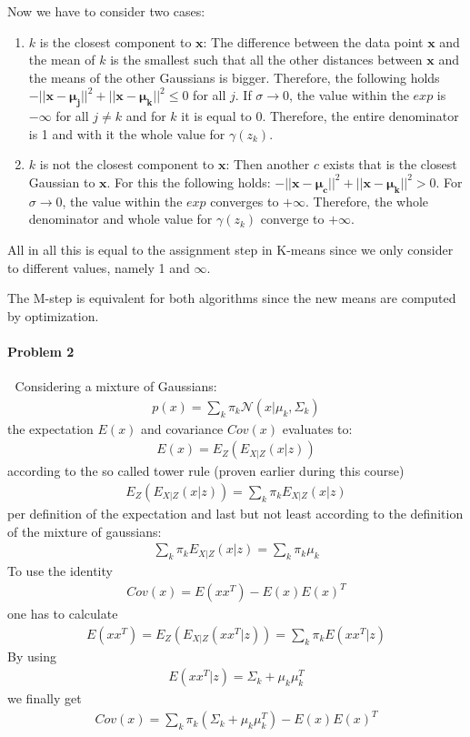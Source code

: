 \documentclass{article}
\renewcommand{\Vec}[1]{\ensuremath{\mathbf{#1}}}
\begin{document}
Now we have to consider two cases:
\begin{enumerate}
\item $k$ is the closest component to $\Vec{x}$: The difference between the data point $\Vec{x}$ and the mean of $k$ is the smallest such that all the other distances between $\Vec{x}$ and the means of the other Gaussians is bigger. Therefore, the following holds $-||\Vec{x}-\Vec{\mu_j}||^2 + ||\Vec{x}-\Vec{\mu_k}||^2 \leq 0$ for all $j$. If $\sigma \rightarrow 0$, the value within the $exp$ is $-\infty$ for all $j \neq k$ and for $k$ it is equal to 0. Therefore, the entire denominator is 1 and with it the whole value for $\gamma(z_k)$.
\item $k$ is not the closest component to $\Vec{x}$: Then another $c$ exists that is the closest Gaussian to $\Vec{x}$. For this the following holds: $-||\Vec{x}-\Vec{\mu_c}||^2 + ||\Vec{x}-\Vec{\mu_k}||^2 > 0$. For $\sigma \rightarrow 0$, the value within the $exp$ converges to $+\infty$. Therefore, the whole denominator and whole value for $\gamma(z_k)$ converge to $+\infty$.
\end{enumerate}

All in all this is equal to the assignment step in K-means since we only consider to different values, namely 1 and $\infty$.

The M-step is equivalent for both algorithms since the new means are computed by optimization.
 

\paragraph*{Problem 2}
$\;$ 
Considering a mixture of Gaussians:
\begin{eqnarray}
p(x) = \sum_k \pi_k \mathcal{N}(x|\mu_k,\Sigma_k)
\end{eqnarray}
the expectation $E(x)$ and covariance $Cov(x)$ evaluates to:
\begin{eqnarray}
E(x) = E_Z(E_{X|Z}(x|z))
\end{eqnarray}
according to the so called tower rule (proven earlier during this course)
\begin{eqnarray}
E_Z(E_{X|Z}(x|z)) = \sum_k \pi_kE_{X|Z}(x|z)
\end{eqnarray}
per definition of the expectation and last but not least according to the definition of the mixture of gaussians:
\begin{eqnarray}
\sum_k \pi_kE_{X|Z}(x|z) = \sum_k \pi_k\mu_k
\end{eqnarray}
To use the identity
\begin{eqnarray}
Cov(x) = E(xx^T) - E(x)E(x)^T
\end{eqnarray}
one has to calculate
\begin{eqnarray}
E(xx^T) = E_Z(E_{X|Z}(xx^T|z)) = \sum_k \pi_k E(xx^T|z)
\end{eqnarray}
By using 
\begin{eqnarray}
E(xx^T|z) = \Sigma_k + \mu_k\mu_k^T
\end{eqnarray}
we finally get
\begin{eqnarray}
Cov(x) = \sum_k \pi_k (\Sigma_k + \mu_k\mu_k^T) - E(x)E(x)^T
\end{eqnarray}
\end{document}
